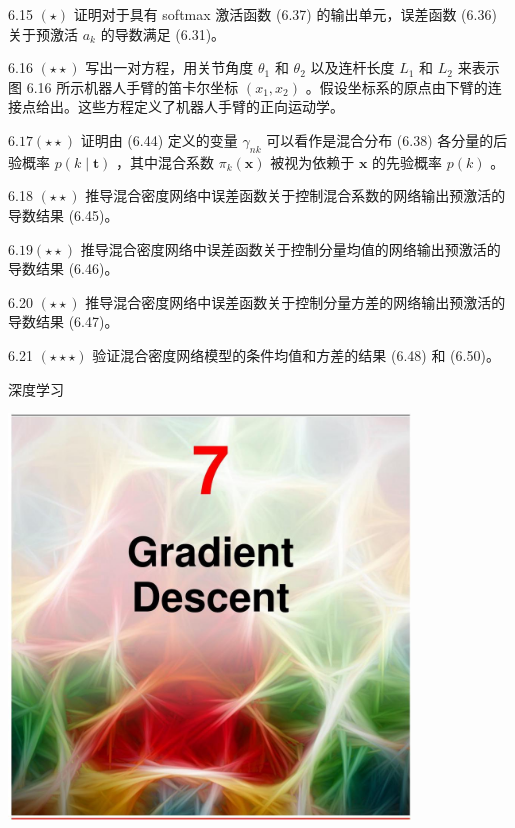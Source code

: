 \documentclass[10pt]{article}
\begin{document}
6.15 \(\left( \star \right)\) 证明对于具有 softmax 激活函数 (6.37) 的输出单元，误差函数 (6.36) 关于预激活 \({a}_{k}\) 的导数满足 (6.31)。

6.16 \(\left( {\star  \star  }\right)\) 写出一对方程，用关节角度 \({\theta }_{1}\) 和 \({\theta }_{2}\) 以及连杆长度 \({L}_{1}\) 和 \({L}_{2}\) 来表示图 6.16 所示机器人手臂的笛卡尔坐标 \(\left( {{x}_{1},{x}_{2}}\right)\) 。假设坐标系的原点由下臂的连接点给出。这些方程定义了机器人手臂的正向运动学。

\({6.17}\left( {\star  \star  }\right)\) 证明由 (6.44) 定义的变量 \({\gamma }_{nk}\) 可以看作是混合分布 (6.38) 各分量的后验概率 \(p\left( {k \mid  \mathbf{t}}\right)\) ，其中混合系数 \({\pi }_{k}\left( \mathbf{x}\right)\) 被视为依赖于 \(\mathbf{x}\) 的先验概率 \(p\left( k\right)\) 。

6.18 \(\left( {\star  \star  }\right)\) 推导混合密度网络中误差函数关于控制混合系数的网络输出预激活的导数结果 (6.45)。

\({6.19}\left( {\star  \star  }\right)\) 推导混合密度网络中误差函数关于控制分量均值的网络输出预激活的导数结果 (6.46)。

6.20 \(\left( {\star  \star  }\right)\) 推导混合密度网络中误差函数关于控制分量方差的网络输出预激活的导数结果 (6.47)。

6.21 \(\left( {\star  \star   \star  }\right)\) 验证混合密度网络模型的条件均值和方差的结果 (6.48) 和 (6.50)。

深度学习

\begin{center}
\includegraphics[max width=0.8\textwidth]{images/0194e279-9b28-703a-88f4-c3ac21e2010d_228_473_352_1075_1085_0.jpg}
\end{center}
\hspace*{3em} 
\end{document}
